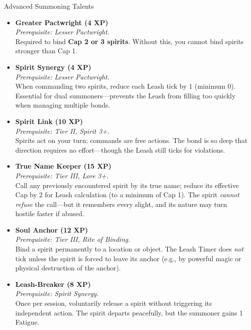 \documentclass[11pt,twoside]{book}
\begin{document}
\begin{mechbox}{Advanced Summoning Talents}
  \begin{itemize}
    \item \textbf{Greater Pactwright (4 XP)} \\
      \textit{Prerequisite: Lesser Pactwright.} \\
      Required to bind \textbf{Cap 2 or 3 spirits}. Without this, you cannot bind spirits stronger than Cap 1.
    \item \textbf{Spirit Synergy (4 XP)} \\
      \textit{Prerequisite: Lesser Pactwright.} \\
      When commanding two spirits, reduce each Leash tick by 1 (minimum 0). Essential for dual summoners---prevents the Leash from filling too quickly when managing multiple bonds.
    \item \textbf{Spirit Link (10 XP)} \\
      \textit{Prerequisite: Tier II, Spirit 3+.} \\
      Spirits act on your turn; commands are free actions. The bond is so deep that direction requires no effort---though the Leash still ticks for violations.
    \item \textbf{True Name Keeper (15 XP)} \\
      \textit{Prerequisite: Tier III, Lore 3+.} \\
      Call any previously encountered spirit by its true name; reduce its effective Cap by 2 for Leash calculation (to a minimum of Cap 1). The spirit \textit{cannot refuse} the call---but it remembers every slight, and its nature may turn hostile faster if abused.
    \item \textbf{Soul Anchor (12 XP)} \\
      \textit{Prerequisite: Tier III, Rite of Binding.} \\
      Bind a spirit permanently to a location or object. The Leash Timer does \textit{not} tick unless the spirit is forced to leave its anchor (e.g., by powerful magic or physical destruction of the anchor).
    \item \textbf{Leash-Breaker (8 XP)} \\
      \textit{Prerequisite: Spirit Synergy.} \\
      Once per session, voluntarily release a spirit without triggering its independent action. The spirit departs peacefully, but the summoner gains 1 Fatigue.
  \end{itemize}
\end{mechbox}
\end{document}
